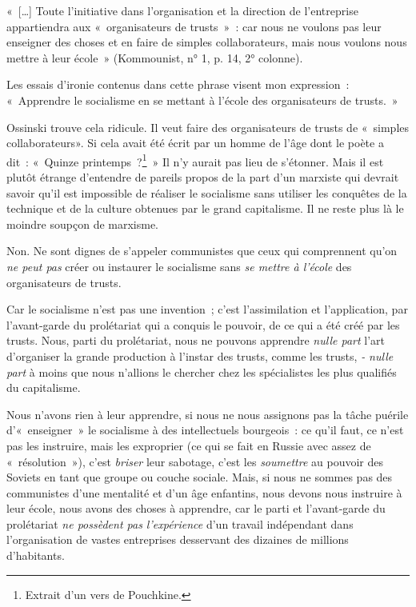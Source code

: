 \documentclass[french,twoside]{book} %
\newenvironment{quoteblock}%
  {\begin{quoting}}
  {\end{quoting}}
\newenvironment{quotebar}{%
    \def\FrameCommand{{\color{rubric!10!}\vrule width 0.5em} \hspace{0.9em}}%
    \def\OuterFrameSep{\itemsep} %
    \MakeFramed {\advance\hsize-\width \FrameRestore}
  }%
  {%
    \endMakeFramed
  }
\renewenvironment{quoteblock}%
  {%
    \savenotes
    \setstretch{0.9}
    \normalfont
    \begin{quotebar}
  }
  {%
    \end{quotebar}
    \spewnotes
  }
\begin{document}
\begin{quoteblock}
 \noindent « […] Toute l’initiative dans l’organisation et la direction de l’entreprise appartiendra aux \hspace{1em}« organisateurs de trusts » : car nous ne voulons pas leur enseigner des choses et en faire de simples collaborateurs, mais nous voulons nous mettre à leur école » (Kommounist, n° 1, p. 14, 2° colonne).
\end{quoteblock}

\noindent Les essais d’ironie contenus dans cette phrase visent mon expression : « Apprendre le socialisme en se mettant à l’école des organisateurs de trusts. »\par
Ossinski trouve cela ridicule. Il veut faire des organisateurs de trusts de « simples collaborateurs». Si cela avait été écrit par un homme de l’âge dont le poète a dit : « Quin­ze printemps ?\footnote{Extrait d’un vers de Pouchkine.} » Il n’y aurait pas lieu de s’éton­ner. Mais il est plutôt étrange d’entendre de pareils propos de la part d’un marxiste qui devrait savoir qu’il est impos­sible de réaliser le socialisme sans utiliser les conquêtes de la technique et de la culture obtenues par le grand capitalis­me. Il ne reste plus là le moindre soupçon de marxisme.\par
Non. Ne sont dignes de s’appeler communistes que ceux qui comprennent qu’on \emph{ne peut pas} créer ou instaurer le socialisme sans \emph{se mettre à l’école} des organisateurs de trusts.\par
Car le socialisme n’est pas une invention ; c’est l’assimilation et l’application, par l’avant‑garde du prolétariat qui a conquis le pouvoir, de ce qui a été créé par les trusts. Nous, parti du prolétariat, nous ne pouvons apprendre \emph{nulle part} l’art d’organiser la grande production à l’instar des trusts, comme les trusts, \emph{‑ nulle part} à moins que nous n’allions le chercher chez les spécialistes les plus qualifiés du capitalisme.\par
\bigbreak
\noindent Nous n’avons rien à leur apprendre, si nous ne nous assignons pas la tâche puérile d’« enseigner » le socialisme à des intellectuels bourgeois : ce qu’il faut, ce n’est pas les instruire, mais les exproprier (ce qui se fait en Russie avec assez de « résolution »), c’est \emph{briser} leur sabotage, c’est les \emph{soumettre} au pouvoir des Soviets en tant que groupe ou couche sociale. Mais, si nous ne sommes pas des communistes d’une mentalité et d’un âge enfantins, nous devons nous instruire à leur école, nous avons des choses à apprendre, car le parti et l’avant‑garde du prolétariat \emph{ne possèdent pas l’expérience} d’un travail indépendant dans l’organisation de vastes entreprises desservant des dizaines de millions d’habitants.\par
\end{document}
